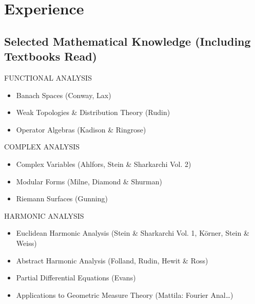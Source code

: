 \documentclass{friggeri-cv}
\begin{document}
\section{Experience}

\subsection{Selected Mathematical Knowledge (Including Textbooks Read)}

\begin{entrylist}


\entries
{FUNCTIONAL ANALYSIS}
{
\begin{itemize}
    \setlength\itemsep{-1em}
    \item Banach Spaces (Conway, Lax)\\
    \item Weak Topologies \& Distribution Theory (Rudin)\\
    \item Operator Algebras (Kadison \& Ringrose)
\end{itemize}
}



\entries
{COMPLEX ANALYSIS}
{
\begin{itemize}
    \setlength\itemsep{-1em}
    \item Complex Variables (Ahlfors, Stein \& Sharkarchi Vol. 2)\\
    \item Modular Forms (Milne, Diamond \& Shurman)\\
    \item Riemann Surfaces (Gunning)
\end{itemize}
}


\entries
{HARMONIC ANALYSIS}
{
\begin{itemize}
    \setlength\itemsep{-1em}
    \item Euclidean Harmonic Analysis (Stein \& Sharkarchi Vol. 1, K\"{o}rner, Stein \& Weiss)\\
    \item Abstract Harmonic Analysis (Folland, Rudin, Hewit \& Ross)\\
    \item Partial Differential Equations (Evans)\\
    \item Applications to Geometric Measure Theory (Mattila: Fourier Anal\dots)
\end{itemize}
}


\end{entrylist}
\end{document}

